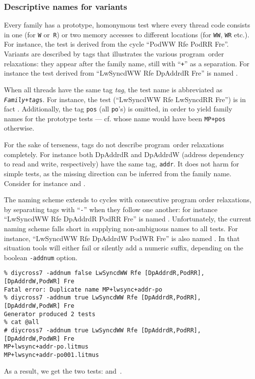 \subsubsection{Descriptive names for variants}
Every family has a prototype, homonymous test where every thread code
consists in one (for \texttt{W} or~\texttt{R}) or two memory accesses
to different locations (for \texttt{WW}, \texttt{WR} etc.).
For instance, the  test
is derived from the cycle ``PodWW Rfe PodRR Fre''.
Variants are described by tags that illustrates the various
program~order relaxations: they appear after the family name, still with ``\texttt{+}'' as a separation.
For instance the test derived from ``LwSyncdWW Rfe DpAddrdR Fre''
is named .

When all threads have the same tag \emph{tag}, the test name is abbreviated
as \texttt{\emph{Family}+\emph{tag}s}. For instance,
the test  (``LwSyncdWW Rfe LwSyncdRR Fre'') is in fact
.
Additionally, the tag \texttt{pos} (all \texttt{po}'s) is omitted,
in order to yield family names for the prototype tests --- cf.
  whose name would have been
\texttt{MP+pos} otherwise.

For the sake of terseness, tags do not describe program~order relaxations
completely. For instance both DpAddrdR and DpAddrdW (address dependency to
read and write, respectively) have the same tag, \texttt{addr}.
It does not harm for simple tests, as the missing direction can be inferred from
the family name. Consider for instance
 and
.
\begin{center}
\qquad{}
\end{center}

The naming scheme extends to cycles with consecutive program order relaxations,
by separating tags with ``\texttt{-}'' when they follow one another:
for instance ``LwSyncdWW Rfe DpAddrdR PodRR Fre'' is named
. Unfortunately, the current naming scheme falls short
in supplying non-ambiguous names to all tests.
For instance,
``LwSyncdWW Rfe DpAddrdW PodWR Fre'' is also named .
In that situation tools will either fail or silently add a numeric suffix,
depending on the boolean \texttt{-addnum} option.
\begin{verbatim}
% diycross7 -addnum false LwSyncdWW Rfe [DpAddrdR,PodRR],[DpAddrdW,PodWR] Fre
Fatal error: Duplicate name MP+lwsync+addr-po
% diycross7 -addnum true LwSyncdWW Rfe [DpAddrdR,PodRR],[DpAddrdW,PodWR] Fre
Generator produced 2 tests
% cat @all
# diycross7 -addnum true LwSyncdWW Rfe [DpAddrdR,PodRR],[DpAddrdW,PodWR] Fre
MP+lwsync+addr-po.litmus
MP+lwsync+addr-po001.litmus
\end{verbatim}
As a result, we get the two tests:
 and~.
\begin{center}
\qquad{}
\end{center}

